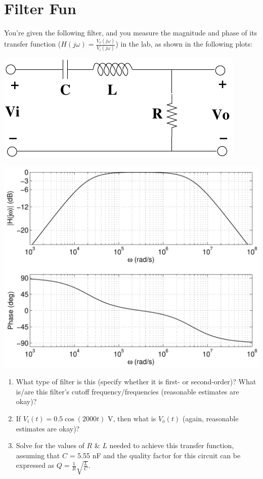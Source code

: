 \section{Filter Fun}
You're given the following filter, and you measure the magnitude and phase of
its transfer function ($H(j\omega) = \frac{V_o(j\omega)}{V_i(j\omega)}$) in the
lab, as shown in the following plots:

\begin{minipage}[l]{0.3\linewidth}
\includegraphics[width=1.0\linewidth]{bpf/bpf_ckt}
\end{minipage}\hfill
\begin{minipage}[l]{0.7\linewidth}
\includegraphics[width=1.0\linewidth]{bpf/bpf}
\end{minipage}

\begin{enumerate}
    \item What type of filter is this (specify whether it is first- or
    second-order)?  What is/are this filter's cutoff frequency/frequencies
    (reasonable estimates are okay)?

    \item If $V_i(t) = 0.5 \cos(2000t)$ V, then what is $V_o(t)$ (again, reasonable estimates are okay)?

    \item Solve for the values of $R$ \& $L$ needed to achieve this transfer
    function, assuming that $C$ = 5.55 nF and the quality factor for this circuit
    can be expressed as $Q = \frac{1}{R}\sqrt{\frac{L}{C}}$.
\end{enumerate}
